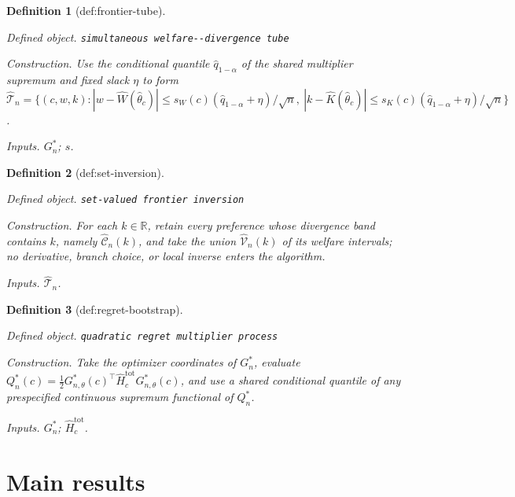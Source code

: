 \documentclass{article}
\newtheorem{definition}{Definition}
\begin{document}
\begin{definition}[def:frontier-tube]\label{def:frontier-tube}
\par\smallskip\noindent\emph{Defined object.} \texttt{simultaneous welfare-\allowbreak{}-\allowbreak{}divergence tube}
\par\smallskip\noindent\emph{Construction.} Use the conditional quantile \(\widehat q_{1-\alpha}\) of the shared multiplier supremum and fixed slack \(\eta\) to form \(\widehat{\mathcal T}_n=\{(c,w,k):|w-\widehat W(\widehat\theta_c)|\le s_W(c)(\widehat q_{1-\alpha}+\eta)/\sqrt n,\ |k-\widehat K(\widehat\theta_c)|\le s_K(c)(\widehat q_{1-\alpha}+\eta)/\sqrt n\}\).
\par\smallskip\noindent\emph{Inputs.} \(G_n^*\); \(s\).
\end{definition}

\begin{definition}[def:set-inversion]\label{def:set-inversion}
\par\smallskip\noindent\emph{Defined object.} \texttt{set-\allowbreak{}valued frontier inversion}
\par\smallskip\noindent\emph{Construction.} For each \(k\in\mathbb R\), retain every preference whose divergence band contains \(k\), namely \(\widehat{\mathcal C}_n(k)\), and take the union \(\widehat{\mathcal V}_n(k)\) of its welfare intervals; no derivative, branch choice, or local inverse enters the algorithm.
\par\smallskip\noindent\emph{Inputs.} \(\widehat{\mathcal T}_n\).
\end{definition}

\begin{definition}[def:regret-bootstrap]\label{def:regret-bootstrap}
\par\smallskip\noindent\emph{Defined object.} \texttt{quadratic regret multiplier process}
\par\smallskip\noindent\emph{Construction.} Take the optimizer coordinates of \(G_n^*\), evaluate \(Q_n^*(c)=\tfrac12G^*_{n,\theta}(c)^\top\widehat H_c^{\mathrm{tot}}G^*_{n,\theta}(c)\), and use a shared conditional quantile of any prespecified continuous supremum functional of \(Q_n^*\).
\par\smallskip\noindent\emph{Inputs.} \(G_n^*\); \(\widehat H_c^{\mathrm{tot}}\).
\end{definition}

\section{Main results}
\end{document}

